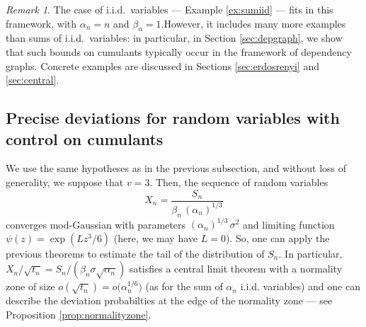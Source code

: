 \documentclass[12pt,a4paper,reqno]{amsart}
\theoremstyle{remark}
\newtheorem{remark}[lemma]{Remark}
\newcommand{\alphan}{\alpha_n}
\newcommand{\betan}{\beta_n}
\begin{document}
\begin{remark}
The case of i.i.d.~variables --- Example \ref{ex:sumiid} --- fits in this framework, with $\alphan=n$ and $\betan=1$.However, it includes many more examples than sums of i.i.d.~variables: in particular, in Section \ref{sec:depgraph}, we show that such bounds on cumulants typically occur in the framework of dependency graphs. Concrete examples are discussed in Sections \ref{sec:erdosrenyi} and \ref{sec:central}.
\end{remark}
\bigskip



\subsection{Precise deviations for random variables with control on cumulants}\label{subsec:deviationscumulant}
We use the same hypotheses as in the previous subsection, and without loss of generality, we suppose that $v=3$. Then, the sequence of random variables
$$X_n=\frac{S_{n}}{\betan\,(\alphan)^{1/3}}$$ 
conver\-ges mod-Gaussian with parameters $(\alphan)^{1/3}\,\sigma^{2}$ and limiting function $\psi(z)=\exp(Lz^{3}/6)$ (here, we may have $L=0$). So, one can apply the previous theorems to estimate the tail of the distribution of $S_n$.
In particular, $X_n/\sqrt{t_n} = S_n/(\betan \sigma \sqrt{\alphan})$ satisfies a central limit theorem
with a normality zone of size $o(\sqrt{t_n}) = o \big( \alphan^{1/6} \big)$ (as for the sum of $\alpha_n$ i.i.d. variables)
and one can describe the deviation probabilties at the edge of the normality zone 
--- see Proposition \ref{prop:normalityzone}.
\end{document}
